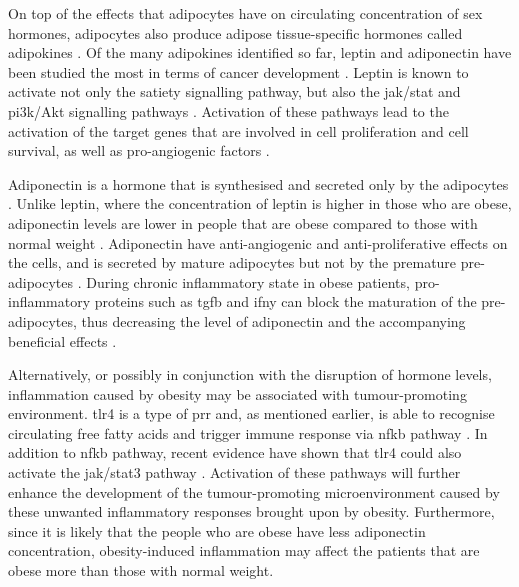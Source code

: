 On top of the effects that \glspl{adipocyte} have on circulating concentration of sex hormones, \glspl{adipocyte} also produce adipose tissue-specific hormones called adipokines \citep{Roberts2010}.
Of the many adipokines identified so far, leptin and adipo\-nectin have been studied the most in terms of cancer development \citep{Renehan2006,Roberts2010}.
Leptin is known to activate not only the satiety signalling pathway, but also the \gls{jak}/\gls{stat} and \gls{pi3k}/Akt signalling pathways \citep{Garofalo2006,Renehan2006}.
Activation of these pathways lead to the activation of the target genes that are involved in cell proliferation and cell survival, as well as pro-angiogenic factors \citep{Garofalo2006}.

Adiponectin is a hormone that is synthesised and secreted only by the \glspl{adipocyte} \citep{Kelesidis2006}.
Unlike leptin, where the concentration of leptin is higher in those who are obese, adiponectin levels are lower in people that are obese compared to those with normal weight \citep{Kelesidis2006,Renehan2006}.
Adiponectin have anti-angiogenic and anti-proliferative effects on the cells, and is secreted by mature \glspl{adipocyte} but not by the premature pre-adipocytes \citep{Gilbert2013}.
During chronic inflammatory state in obese patients, pro-inflammatory proteins such as \gls{tgfb} and \gls{ifny} can block the maturation of the pre-adipocytes, thus decreasing the level of adiponectin and the accompanying beneficial effects \citep{Gilbert2013}.

Alternatively, or possibly in conjunction with the disruption of hormone levels, inflammation caused by obesity may be associated with tumour-promoting environment.
\Gls{tlr}4 is a type of \gls{prr} and, as mentioned earlier, is able to recognise circulating free fatty acids and trigger immune response via \gls{nfkb} pathway \citep{Lumeng2011}.
In addition to \gls{nfkb} pathway, recent evidence have shown that \gls{tlr}4 could also activate the \gls{jak}/\gls{stat3} pathway \citep{Yu2014}.
Activation of these pathways will further enhance the development of the tumour-promoting microenvironment caused by these unwanted inflammatory responses brought upon by obesity.
Furthermore, since it is likely that the people who are obese have less adiponectin concentration, obesity-induced inflammation may affect the patients that are obese more than those with normal weight.

